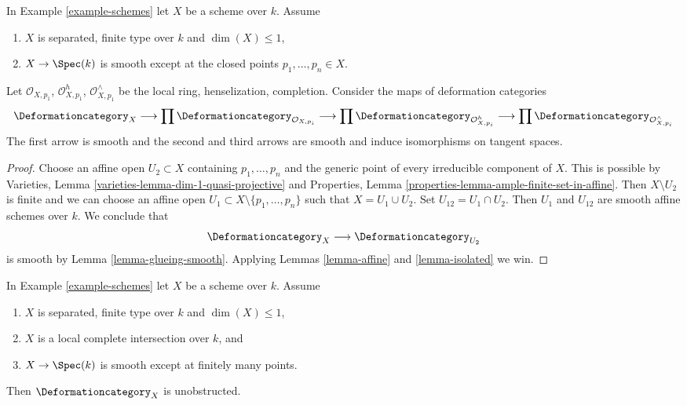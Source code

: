 \begin{lemma}
\label{lemma-curve-isolated}
In Example \ref{example-schemes} let $X$ be a scheme over $k$. Assume
\begin{enumerate}
\item $X$ is separated, finite type over $k$ and $\dim(X) \leq 1$,
\item $X \to \Spec(k)$ is smooth except at the closed
points $p_1, \ldots, p_n \in X$.
\end{enumerate}
Let $\mathcal{O}_{X, p_1}$, $\mathcal{O}_{X, p_1}^h$,
$\mathcal{O}_{X, p_1}^\wedge$ be the local ring, henselization, completion.
Consider the maps of deformation categories
$$
\Deformationcategory_X
\longrightarrow
\prod \Deformationcategory_{\mathcal{O}_{X, p_i}}
\longrightarrow
\prod \Deformationcategory_{\mathcal{O}_{X, p_i}^h}
\longrightarrow
\prod \Deformationcategory_{\mathcal{O}_{X, p_i}^\wedge}
$$
The first arrow is smooth and the second and third arrows
are smooth and induce isomorphisms on tangent spaces.
\end{lemma}

\begin{proof}
Choose an affine open $U_2 \subset X$ containing
$p_1, \ldots, p_n$ and the generic point of every irreducible
component of $X$. This is possible by
Varieties, Lemma \ref{varieties-lemma-dim-1-quasi-projective}
and Properties, Lemma \ref{properties-lemma-ample-finite-set-in-affine}.
Then $X \setminus U_2$ is finite and we can choose an affine open
$U_1 \subset X \setminus \{p_1, \ldots, p_n\}$ such that
$X = U_1 \cup U_2$. Set $U_{12} = U_1 \cap U_2$.
Then $U_1$ and $U_{12}$ are smooth affine schemes over $k$.
We conclude that
$$
\Deformationcategory_X \longrightarrow \Deformationcategory_{U_2}
$$
is smooth by Lemma \ref{lemma-glueing-smooth}.
Applying Lemmas \ref{lemma-affine} and \ref{lemma-isolated} we win.
\end{proof}

\begin{lemma}
\label{lemma-curve-isolated-lci}
In Example \ref{example-schemes} let $X$ be a scheme over $k$. Assume
\begin{enumerate}
\item $X$ is separated, finite type over $k$ and $\dim(X) \leq 1$,
\item $X$ is a local complete intersection over $k$, and
\item $X \to \Spec(k)$ is smooth except at finitely many points.
\end{enumerate}
Then $\Deformationcategory_X$ is unobstructed.
\end{lemma}

